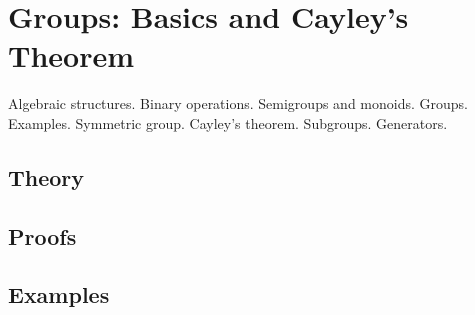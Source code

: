
\section{Groups: Basics and Cayley's Theorem}
\label{sec:2.2.11-groups-basics}

\begin{ticket}
Algebraic structures. Binary operations. Semigroups and monoids. Groups. Examples. Symmetric group. Cayley's theorem. Subgroups. Generators.
\end{ticket}

\subsection*{Theory}

\subsection*{Proofs}

\subsection*{Examples}
